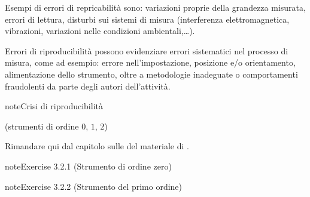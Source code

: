 \documentclass[letterpaper,10pt,italian]{jupyterBook}
\begin{document}
\sphinxAtStartPar
Esempi di errori di repricabilità sono: variazioni proprie della grandezza misurata, errori di lettura, disturbi sui sistemi di misura (interferenza elettromagnetica, vibrazioni, variazioni nelle condizioni ambientali,…).

\sphinxAtStartPar
Errori di riproducibilità possono evidenziare errori sistematici nel processo di misura, come ad esempio: errore nell’impostazione, posizione e/o orientamento, alimentazione dello strumento, oltre a metodologie inadeguate o comportamenti fraudolenti da parte degli autori dell’attività.

\begin{sphinxadmonition}{note}{Crisi di riproducibilità}



\sphinxAtStartPar
{}
\end{sphinxadmonition}

\sphinxAtStartPar
{}

\sphinxAtStartPar
{}

\sphinxAtStartPar
{}

\sphinxAtStartPar
{}

\sphinxAtStartPar
{} (strumenti di ordine \(0\), \(1\), \(2\))

\sphinxAtStartPar
Rimandare qui dal capitolo sulle  del materiale di .
 \label{exercise:instrument-order-zero-exercise}

\begin{sphinxadmonition}{note}{Exercise 3.2.1 (Strumento di ordine zero)}



\sphinxAtStartPar
{}
\end{sphinxadmonition}
 \label{exercise:instrument-order-one-exercise}

\begin{sphinxadmonition}{note}{Exercise 3.2.2 (Strumento del primo ordine)}



\sphinxAtStartPar
{}
\end{sphinxadmonition}
 \label{exercise:instrument-order-two-exercise}
\end{document}
